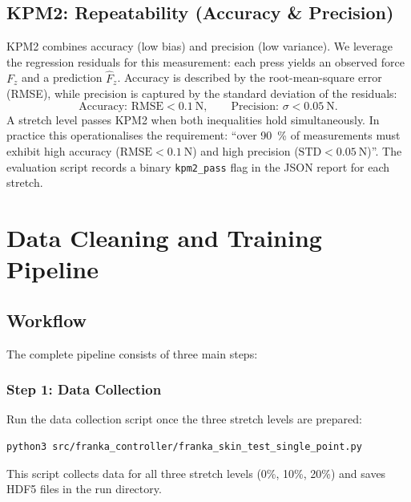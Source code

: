 \documentclass[11pt,a4paper]{article}
\begin{document}
\subsection{KPM2: Repeatability (Accuracy \& Precision)}
KPM2 combines accuracy (low bias) and precision (low variance). We leverage the regression residuals
for this measurement: each press yields an observed force \(F_z\) and a prediction \(\hat{F}_z\).
Accuracy is described by the root-mean-square error (RMSE), while precision is captured by the
standard deviation of the residuals:
\[
    \text{Accuracy: } \text{RMSE} < 0.1~\text{N}, \qquad
    \text{Precision: } \sigma < 0.05~\text{N}.
\]
A stretch level passes KPM2 when both inequalities hold simultaneously. In practice this
operationalises the requirement: “over 90~\% of measurements must exhibit high accuracy
(\(\text{RMSE} < 0.1~\text{N}\)) and high precision (\(\text{STD} < 0.05~\text{N}\))”. The evaluation
script records a binary \texttt{kpm2\_pass} flag in the JSON report for each stretch.

\section{Data Cleaning and Training Pipeline}

\subsection{Workflow}
The complete pipeline consists of three main steps:

\subsubsection{Step 1: Data Collection}
Run the data collection script once the three stretch levels are prepared:
\begin{verbatim}
python3 src/franka_controller/franka_skin_test_single_point.py
\end{verbatim}
This script collects data for all three stretch levels (0\%, 10\%, 20\%) and saves HDF5 files in the run directory.
\end{document}
